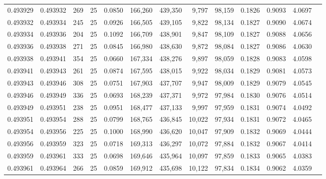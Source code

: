 \begin{tabular}{rrrrrrrrrrrrr}
0.493929 & 0.493932 &   269 &  25 &                                     0.0850 & 166,260 & 439,350 &   9,797 &  98,159 & 0.1826 & 0.9093 & 4.0697 \\
0.493932 & 0.493934 &   245 &  25 &                                     0.0926 & 166,505 & 439,105 &   9,822 &  98,134 & 0.1827 & 0.9090 & 4.0674 \\
0.493934 & 0.493936 &   204 &  25 &                                     0.1092 & 166,709 & 438,901 &   9,847 &  98,109 & 0.1827 & 0.9088 & 4.0656 \\
0.493936 & 0.493938 &   271 &  25 &                                     0.0845 & 166,980 & 438,630 &   9,872 &  98,084 & 0.1827 & 0.9086 & 4.0630 \\
0.493938 & 0.493941 &   354 &  25 &                                     0.0660 & 167,334 & 438,276 &   9,897 &  98,059 & 0.1828 & 0.9083 & 4.0598 \\
0.493941 & 0.493943 &   261 &  25 &                                     0.0874 & 167,595 & 438,015 &   9,922 &  98,034 & 0.1829 & 0.9081 & 4.0573 \\
0.493943 & 0.493946 &   308 &  25 &                                     0.0751 & 167,903 & 437,707 &   9,947 &  98,009 & 0.1829 & 0.9079 & 4.0545 \\
0.493946 & 0.493949 &   336 &  25 &                                     0.0693 & 168,239 & 437,371 &   9,972 &  97,984 & 0.1830 & 0.9076 & 4.0514 \\
0.493949 & 0.493951 &   238 &  25 &                                     0.0951 & 168,477 & 437,133 &   9,997 &  97,959 & 0.1831 & 0.9074 & 4.0492 \\
0.493951 & 0.493954 &   288 &  25 &                                     0.0799 & 168,765 & 436,845 &  10,022 &  97,934 & 0.1831 & 0.9072 & 4.0465 \\
0.493954 & 0.493956 &   225 &  25 &                                     0.1000 & 168,990 & 436,620 &  10,047 &  97,909 & 0.1832 & 0.9069 & 4.0444 \\
0.493956 & 0.493959 &   323 &  25 &                                     0.0718 & 169,313 & 436,297 &  10,072 &  97,884 & 0.1832 & 0.9067 & 4.0414 \\
0.493959 & 0.493961 &   333 &  25 &                                     0.0698 & 169,646 & 435,964 &  10,097 &  97,859 & 0.1833 & 0.9065 & 4.0383 \\
0.493961 & 0.493964 &   266 &  25 &                                     0.0859 & 169,912 & 435,698 &  10,122 &  97,834 & 0.1834 & 0.9062 & 4.0359 \\

\end{tabular}
